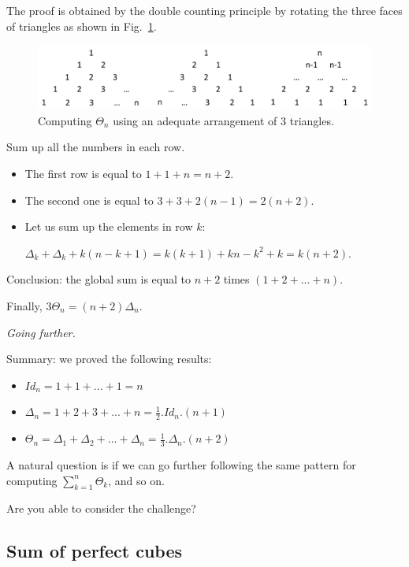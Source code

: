The proof is obtained by the double counting principle by rotating the three faces of triangles as shown in Fig.~\ref{fig:Tetrahedral}.
\begin{figure}[h]
\begin{center}
        \includegraphics[scale=0.5]{FiguresArithmetic/Tetrahedral}
        \caption{Computing $\Theta_n$ using an adequate arrangement of $3$ triangles.}
        \label{fig:Tetrahedral}
\end{center}
\end{figure}

Sum up all the numbers in each row.

\begin{itemize}
\item 
The first row is equal to $1+1+n = n+2$.
\item
The second one is equal to $3 + 3 + 2(n-1) = 2(n+2)$. 
\item
Let us sum up the elements in row $k$: 

$\Delta_k + \Delta_k + k(n-k+1)  = k(k+1) + kn-k^2+k = k(n+2)$.
\end{itemize}

Conclusion:
the global sum is equal to $n+2$ times $(1+2+...+n)$.

Finally, $3 \Theta_n = (n+2) \Delta_n$.
\medskip

\noindent \textit{Going further.}

Summary: we proved the following results:
\begin{itemize}
\item $Id_n = 1+1+ ... +1 = n$
\item $\Delta_n = 1+2+3+ ... +n = \frac{1}{2}.Id_n.(n+1)$
\item $\Theta_n = \Delta_1 + \Delta_2 + ... + \Delta_n = \frac{1}{3} .\Delta_n.(n+2)$
\end{itemize}

A natural question is if we can go further following the same pattern for computing 
$ \sum_{k=1}^{n} \Theta_k$, and so on.

Are you able to consider the challenge?


\subsection{Sum of perfect cubes}

